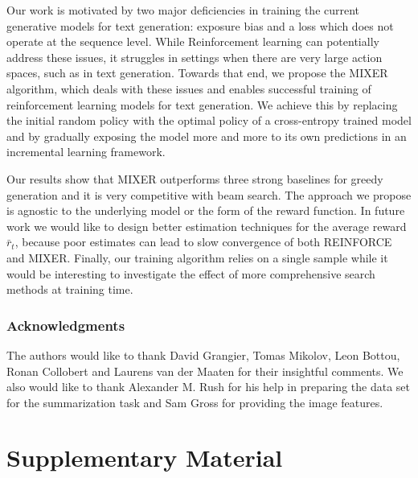 \documentclass{article} \usepackage{iclr2016_conference,times}
\begin{document}
Our work is motivated by two major deficiencies in training the current generative models for text generation: exposure bias and a loss which does not operate at the sequence level.
While Reinforcement learning can potentially address these issues, it struggles in settings when 
there are very large action spaces, such as in text generation. Towards that end, 
we propose the MIXER algorithm, which deals with these issues and enables successful training of reinforcement learning models for text generation. 
We achieve this by replacing the initial random policy with the optimal policy of a cross-entropy trained model and by gradually exposing the model more and more to its own predictions in an incremental learning framework.








Our results show that MIXER outperforms three strong baselines for greedy generation and it is very competitive with beam search. 
The approach we propose is agnostic to the underlying model or the form of the reward function. 
In future work we would like to design better estimation techniques for the average reward $\bar{r}_t$, because poor estimates can lead to slow convergence of both REINFORCE and MIXER. 
Finally, our training algorithm relies on a single sample while it would be interesting to investigate the effect of more comprehensive search methods at training time.


















 
\subsubsection*{Acknowledgments}
The authors would like to thank David Grangier, Tomas Mikolov, Leon Bottou, Ronan Collobert and Laurens van der Maaten for their insightful comments. 
We also would like to thank Alexander M. Rush for his help in preparing the data set for the summarization task and Sam Gross for providing the image features. 



\newpage
\section{Supplementary Material}
\end{document}
